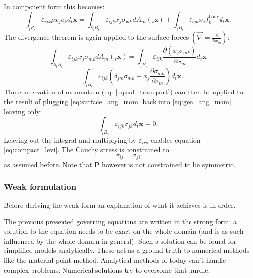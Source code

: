 \documentclass[m,times]{cgMA}
\begin{document}
In component form this becomes:
\begin{equation}\label{eq:gen_ang_mom}
  \int _ {_tB _ { \epsilon}  } \varepsilon_{ijk} \rho x_j a_k d _t\boldsymbol{x} = \int _ { \partial _tB _ {\epsilon  } } \varepsilon_{ijk} x_j \sigma_{mk} dA_m(_t\boldsymbol{x} ) + \int _ { _tB_\epsilon } \varepsilon_{ijk} x_j f_k ^ {\text{body} } d _t\boldsymbol{x}.
\end{equation}
The divergence theorem is again applied to the surface forces $\left(\vec{\nabla} = \frac{\partial}{\partial x_m}\right)$:
$$
\int _ { \partial _tB _ {\epsilon  } } \varepsilon_{ijk} x_j \sigma_{mk} dA_m (_t\boldsymbol{x} ) =
\int _ {_tB _ {\epsilon  } } \varepsilon_{ijk} \frac{\partial(x_j \sigma_{mk})}{\partial x_m} d_t\boldsymbol{x}
$$
\begin{equation}\label{eq:surface_ang_mom}
  = \int _ {_tB _ {\epsilon  } } \varepsilon_{ijk} \left(\delta_{jm} \sigma_{mk}+ x_j\frac{ \partial \sigma_{mk}}{\partial x_m}\right) d_t\boldsymbol{x}.
\end{equation}
The conservation of momentum (eq. \ref{eq:eul_transport}) can then be applied to the result of plugging \ref{eq:surface_ang_mom} back into \ref{eq:gen_ang_mom} leaving only:
\begin{equation}
  \int _ {_tB _ {\epsilon  } } \varepsilon_{ijk} \sigma_{jk} d_t\boldsymbol{x} = 0.
\end{equation}
Leaving out the integral and multiplying by ${\varepsilon_{irs}}$ enables equation \ref{eq:compact_levi}. The Cauchy stress is constrained to
\begin{equation}
  \sigma_{ij} =\sigma_{ji}
\end{equation}
as assumed before. Note that $\boldsymbol{P}$ however is not constrained to be symmetric.
\subsubsection{Weak formulation}\label{sec:weak}
Before deriving the weak form an explanation of what it achieves is in order.

The previous presented governing equations are written in the strong form: a solution to the equation needs to be exact on the whole domain (and is as such influenced by the whole domain in general). Such a solution can be found for simplified models analytically. These act as a ground truth to numerical methods like the material point method. Analytical methods of today can't handle complex problems: Numerical solutions try to overcome that hurdle.
\end{document}

